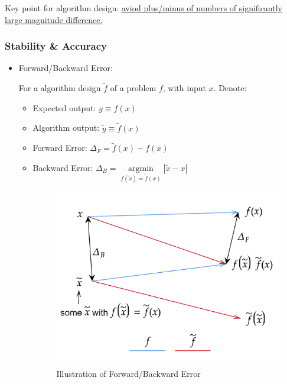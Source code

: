     Key point for algorithm design: \uline{aviod plus/minus of numbers of significantly large magnitude difference.}
    
\subsubsection{Stability \& Accuracy} 

\begin{itemize}[topsep=2pt,itemsep=0pt]
    \item Forward/Backward Error:
    
    For a algorithm design $ \tilde{f} $ of a problem $ f $, with input $ x $. Denote:
\begin{itemize}[topsep=2pt,itemsep=0pt]
    \item Expected output: $ y\equiv f(x) $
    \item Algorithm output: $ \tilde{y}\equiv \tilde{f}(x) $
    \item Forward Error: $ \Delta _F=\tilde{f}(x)-f(x) $
    \item Backward Error: $ \Delta _B=\mathop{\arg\min}\limits_{f(\tilde{x})=\tilde{f}(x)} |\tilde{x}-x|  $
\begin{figure}[H]
    \centering
    \includegraphics[width=0.7\linewidth]{sections/images/ForwardError.png}
    \caption{Illustration of Forward/Backward Error}
\end{figure}


\end{itemize}
\end{itemize}
